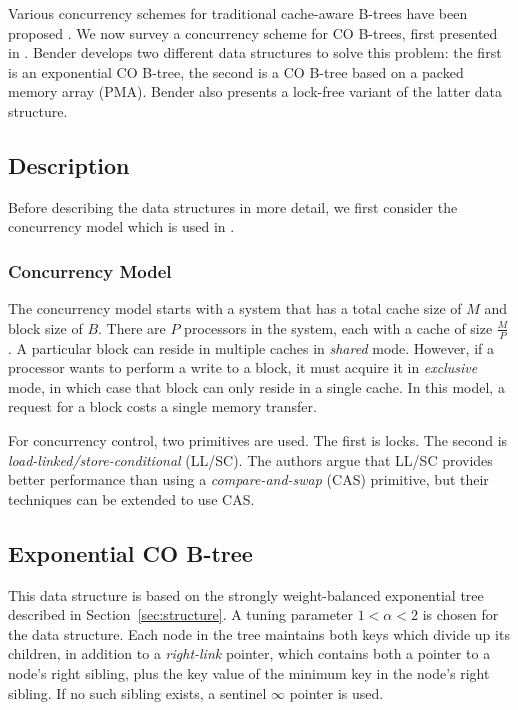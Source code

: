 \documentclass[preprint]{style}
\begin{document}
Various concurrency schemes for traditional cache-aware B-trees have been
proposed \cite{BayerS77, LehmanY81}. We now survey a concurrency scheme for CO
B-trees, first presented in \cite{BenderFiGi05}. Bender develops two different
data structures to solve this problem: the first is an exponential CO B-tree,
the second is a CO B-tree based on a packed memory array (PMA). Bender also
presents a lock-free variant of the latter data structure.

\subsection{Description}

Before describing the data structures in more detail, we first consider
the concurrency model which is used in \cite{BenderFiGi05}.

\newpage

\subsubsection{Concurrency Model}

The concurrency model starts with a system that has a total cache size of $M$
and block size of $B$. There are $P$ processors in the system, each with a
cache of size $\frac{M}{P}$. A particular block can reside in multiple caches
in \textit{shared} mode. However, if a processor wants to perform a write to a
block, it must acquire it in \textit{exclusive} mode, in which case that block
can only reside in a single cache. In this model, a request for a block costs
a single memory transfer.

For concurrency control, two primitives are used. The first is locks. The
second is \textit{load-linked/store-conditional} (LL/SC). The authors argue
that LL/SC provides better performance than using a \textit{compare-and-swap}
(CAS) primitive, but their techniques can be extended to use CAS.

\subsection{Exponential CO B-tree}

This data structure is based on the strongly weight-balanced exponential tree
described in Section~\ref{sec:structure}. A tuning parameter $1 < \alpha < 2$
is chosen for the data structure. Each node in the tree maintains both keys
which divide up its children, in addition to a \textit{right-link} pointer,
which contains both a pointer to a node's right sibling, plus the key value of
the minimum key in the node's right sibling. If no such sibling exists, a
sentinel $\infty$ pointer is used.
\end{document}
